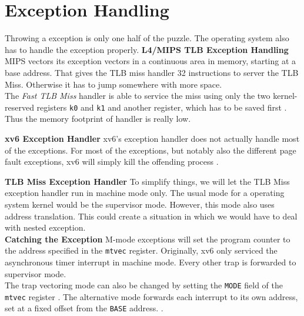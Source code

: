 \section{Exception Handling}
Throwing a exception is only one half of the puzzle. The operating system also has to handle the exception
properly.
\textbf{L4/MIPS TLB Exception Handling}
MIPS vectors its exception vectors in a continuous area in memory, starting at a base address.
That gives the TLB miss handler 32 instructions to server the TLB Miss. Otherwise it has to jump
somewhere with more space.\\
The \emph{Fast TLB Miss} handler is able to service the miss using only the two kernel-reserved
registers \texttt{k0} and \texttt{k1} and another register, which has to be saved first \cite{heiserAnatomyHighPerformanceMicrokernel}.\\
Thus the memory footprint of handler is really low.

\textbf{xv6 Exception Handler}
xv6's exception handler does not actually handle most of the exceptions. For most of the exceptions,
but notably also the different page fault exceptions, xv6 will simply kill the offending process \cite{cox2011xv6}.

\textbf{TLB Miss Exception Handler}
To simplify things, we will let the TLB Miss exception handler run in machine mode only.
The usual mode for a operating system kernel would be the supervisor mode. However, this
mode also uses address translation. This could create a situation in which we would have
to deal with nested exception.\\

\textbf{Catching the Exception} M-mode exceptions will set the program counter to the address
specified in the \texttt{mtvec} register. Originally, xv6 only serviced the asynchronous
timer interrupt in machine mode. Every other trap is forwarded to supervisor mode.\\
The trap vectoring mode can also be changed by setting the \texttt{MODE} field of the
\texttt{mtvec} register \cite{RISCVInstructionSet}. The alternative mode forwards
each interrupt to its own address, set at a fixed offset from the \texttt{BASE} address.
.

